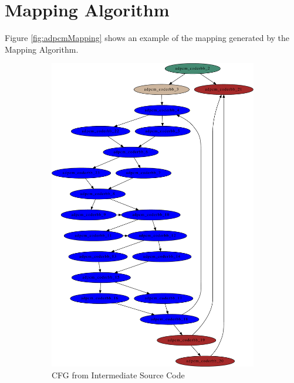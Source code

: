 \chapter{Mapping Algorithm}
\label{app:mappingAlgo}

Figure \ref{fig:adpcmMapping} shows an example of the mapping generated by the Mapping Algorithm. 

\begin{figure}[h!]
\centering
\begin{subfigure}[t]{.67\textwidth}
\captionsetup{margin=10pt}
\includegraphics[width=\textwidth]{figures/isc_adpcm_IR_adpcm_coder-crop.pdf}
\caption{CFG from Intermediate Source Code}
\label{fig:cfgAdpcmISC}
\end{subfigure}%
~
\begin{subfigure}[t]{.33\textwidth}

\end{subfigure}
\end{figure}
